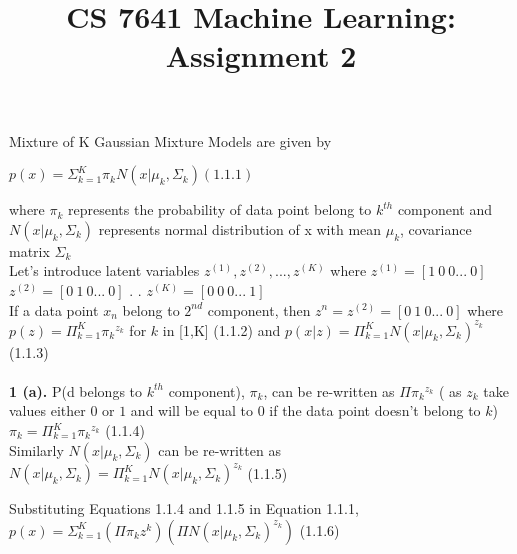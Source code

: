 \documentclass{article}
\title{CS 7641 Machine Learning: Assignment 2}
\begin{document}
\maketitle
\section{}
\newline Mixture of K Gaussian Mixture Models are given by
\newline

   $p(x) = \Sigma_{k=1}^K\pi_k N(x|\mu_k,\Sigma_k) (1.1.1) $

where $\pi_k$ represents the probability of data point belong to $k^{th}$ component and $N(x|\mu_k,\Sigma_k)$ represents normal distribution of x with mean $\mu_k$, covariance matrix $\Sigma_k$\\

Let's introduce latent variables $z^{(1)},z^{(2)},...,z^{(K)}$ where 
\newline
$z^{(1)}=[1\  0\  0...\ 0 ]$
\newline
$z^{(2)}=[0\ 1 \ 0...\ 0 ]$
\newline.
\newline.
\newline$z^{(K)}=[0\  0\  0...\  1 ]$
\\
If a data point $x_n$ belong to $2^{nd}$ component, then $z^n=z^{(2)}=[0\ 1 \ 0...\ 0 ]$
\newline where $p(z)=\Pi_{k=1}^K{\pi_k}^{z_k}$ for $k$ in [1,K] (1.1.2)
\newline and $p(x|z)= \Pi_{k=1}^K N(x|\mu_k,\Sigma_k)^{z_k}$ (1.1.3)
\\
\\
\textbf{1 (a).}
\newline P(d belongs to $k^{th}$ component), $\pi_k$, can be re-written as $\Pi{\pi_k}^{z_k}$ ( as $z_k$ take values either $0$ or $1$ and will be equal to $0$ if the data point doesn't belong to $k$) 
\newline $\pi_k=\Pi_{k=1}^K{\pi_k}^{z_k}$ (1.1.4)\\
Similarly $N(x|\mu_k,\Sigma_k)$ can be re-written as 
\newline $N(x|\mu_k,\Sigma_k) = \Pi_{k=1}^K N(x|\mu_k,\Sigma_k)^{z_k} $ (1.1.5)

Substituting Equations 1.1.4 and 1.1.5 in Equation 1.1.1,
\newline $p(x)= \Sigma_{k=1}^K(\Pi \pi_k z^k)(\Pi N(x|\mu_k,\Sigma_k)^{z_k})$ (1.1.6)
\end{document}
